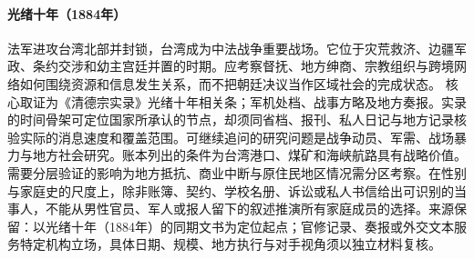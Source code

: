 \hypertarget{public:EQ-1884-TAIWAN-BLOCKADE}{}\paragraph{光绪十年（1884年）}法军进攻台湾北部并封锁，台湾成为中法战争重要战场。它位于灾荒救济、边疆军政、条约交涉和幼主宫廷并置的时期。应考察督抚、地方绅商、宗教组织与跨境网络如何围绕资源和信息发生关系，而不把朝廷决议当作区域社会的完成状态。 核心取证为《清德宗实录》光绪十年相关条；军机处档、战事方略及地方奏报。实录的时间骨架可定位国家所承认的节点，却须同省档、报刊、私人日记与地方记录核验实际的消息速度和覆盖范围。可继续追问的研究问题是战争动员、军需、战场暴力与地方社会研究。账本列出的条件为台湾港口、煤矿和海峡航路具有战略价值。需要分层验证的影响为地方抵抗、商业中断与原住民地区情况需分区考察。在性别与家庭史的尺度上，除非账簿、契约、学校名册、诉讼或私人书信给出可识别的当事人，不能从男性官员、军人或报人留下的叙述推演所有家庭成员的选择。来源保留：以光绪十年（1884年）的同期文书为定位起点；官修记录、奏报或外交文本服务特定机构立场，具体日期、规模、地方执行与对手视角须以独立材料复核。
